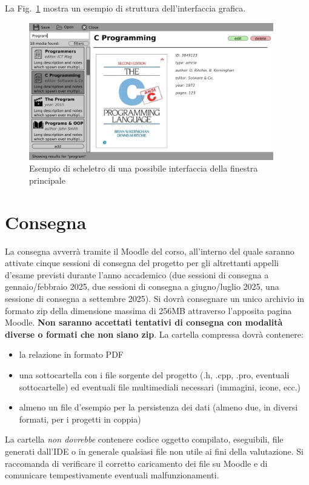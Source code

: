 \documentclass[10pt,a4paper,oneside]{article}
\begin{document}
La Fig.~\ref{fig:skeleton} mostra un esempio di struttura dell'interfaccia grafica.

\begin{figure}[t]
	\includegraphics[width=0.95\textwidth]{assets/gui-skeleton-sample}
	\caption{Esempio di scheletro di una possibile interfaccia della finestra principale}\label{fig:skeleton}
\end{figure}

\section{Consegna}
La consegna avverrà tramite il Moodle del corso, all'interno del quale saranno attivate cinque sessioni di consegna del progetto per gli altrettanti appelli d'esame previsti durante l'anno accademico (due sessioni di consegna a gennaio/febbraio 2025, due sessioni di consegna a giugno/luglio 2025, 
una sessione di consegna a settembre 2025). Si dovrà consegnare un unico archivio in formato zip della dimensione massima di 256MB attraverso l'apposita pagina Moodle. \textbf{Non saranno accettati tentativi di consegna con modalità diverse o formati che non siano zip}. La cartella compressa dovrà contenere:
\begin{itemize}
 \item la relazione in formato PDF
 \item una sottocartella con i file sorgente del progetto (.h, .cpp, .pro, eventuali sottocartelle) ed eventuali file multimediali necessari (immagini, icone, ecc.)
 \item almeno un file d'esempio per la persistenza dei dati (almeno due, in diversi formati, per i progetti in coppia)
\end{itemize}
La cartella \emph{non dovrebbe} contenere codice oggetto compilato, eseguibili, file generati dall'IDE o in generale qualsiasi file non utile ai fini della valutazione. Si raccomanda di verificare il corretto caricamento dei file su Moodle e di comunicare tempestivamente eventuali malfunzionamenti.
\end{document}
